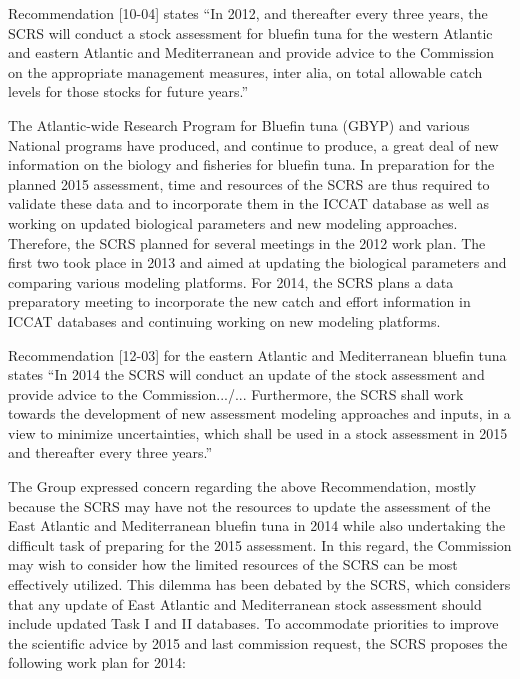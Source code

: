 
Recommendation [10-04] states “In 2012, and thereafter every three years, the SCRS will conduct a stock assessment for bluefin tuna for the western Atlantic and eastern Atlantic and Mediterranean and provide advice to the Commission on the appropriate management measures, inter alia, on total allowable catch levels for those stocks for future years.” 

The Atlantic-wide Research Program for Bluefin tuna (GBYP) and various National programs have produced, and continue to produce, a great deal of new information on the biology and fisheries for bluefin tuna. In preparation for the planned 2015 assessment, time and resources of the SCRS are thus required to validate these data and to incorporate them in the ICCAT database as well as working on updated biological parameters and new modeling approaches. Therefore, the SCRS planned for several meetings in the 2012 work plan. The first two took place in 2013 and aimed at updating the biological parameters and comparing various modeling platforms. For 2014, the SCRS plans a data preparatory meeting to incorporate the new catch and effort information in ICCAT databases and continuing working on new modeling platforms. 

Recommendation [12-03] for the eastern Atlantic and Mediterranean bluefin tuna states “In 2014 the SCRS will conduct an update of the stock assessment and provide advice to the Commission.../... Furthermore, the SCRS shall work towards the development of new assessment modeling approaches and inputs, in a view to minimize uncertainties, which shall be used in a stock assessment in 2015 and thereafter every three years.” 

The Group expressed concern regarding the above Recommendation, mostly because the SCRS may have not the resources to update the assessment of the East Atlantic and Mediterranean bluefin tuna in 2014 while also undertaking the difficult task of preparing for the 2015 assessment. In this regard, the Commission may wish to consider how the limited resources of the SCRS can be most effectively utilized. This dilemma has been debated by the SCRS, which considers that any update of East Atlantic and Mediterranean stock assessment should include updated Task I and II databases. To accommodate priorities to improve the scientific advice by 2015 and last commission request, the SCRS proposes the following work plan for 2014:

